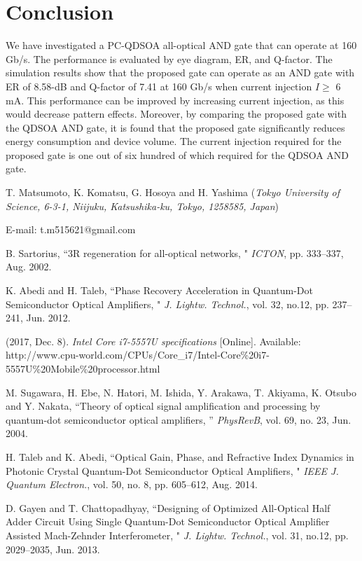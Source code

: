\documentclass[twocolumn]{el-author}
\begin{document}
\section{Conclusion}
We have investigated a PC-QDSOA all-optical AND gate that can operate at 160 Gb/s. The performance is evaluated by eye diagram, ER, and Q-factor. The simulation results show that the proposed gate can operate as an AND gate with ER of 8.58-dB and Q-factor of 7.41 at 160 Gb/s when current injection $I \geq$ 6 mA. This performance can be improved by increasing current injection, as this would decrease pattern effects. Moreover, by comparing the proposed gate with the QDSOA AND gate, it is found that the proposed gate significantly reduces energy consumption and device volume. The current injection required for the proposed gate is one out of six hundred of which required for the QDSOA AND gate.
\vskip3pt

\vskip5pt

\noindent T. Matsumoto, K. Komatsu, G. Hosoya and H. Yashima (\textit{Tokyo University of Science, 6-3-1, Niijuku, Katsushika-ku, Tokyo, 1258585, Japan})
\vskip3pt

\noindent E-mail: t.m515621@gmail.com

\begin{thebibliography}{9}
B. Sartorius, ``3R regeneration for all-optical networks, " {\it ICTON}, pp. 333--337, Aug. 2002.

K. Abedi and H. Taleb, ``Phase Recovery Acceleration in Quantum-Dot Semiconductor Optical Amplifiers, " {\it J. Lightw. Technol.}, vol. 32, no.12, pp. 237--241, Jun. 2012.

(2017, Dec. 8). {\it Intel Core i7-5557U specifications} [Online]. Available: http://www.cpu-world.com/CPUs/Core\_i7/Intel-Core\%20i7-5557U\%20Mobile\%20processor.html

M. Sugawara, H. Ebe, N. Hatori, M. Ishida, Y. Arakawa, T. Akiyama, K. Otsubo and Y. Nakata, ``Theory of optical signal amplification and processing by quantum-dot semiconductor optical amplifiers, '' {\it PhysRevB}, vol. 69, no. 23, Jun. 2004.

H. Taleb and K. Abedi, ``Optical Gain, Phase, and Refractive Index Dynamics in Photonic Crystal Quantum-Dot Semiconductor Optical Amplifiers, " {\it IEEE J. Quantum Electron.}, vol. 50, no. 8, pp. 605--612, Aug. 2014.

D. Gayen and T. Chattopadhyay, ``Designing of Optimized All-Optical Half Adder Circuit Using Single Quantum-Dot Semiconductor Optical Amplifier Assisted Mach-Zehnder Interferometer, " {\it J. Lightw. Technol.}, vol. 31, no.12, pp. 2029--2035, Jun. 2013.

\end{thebibliography}
\end{document}
